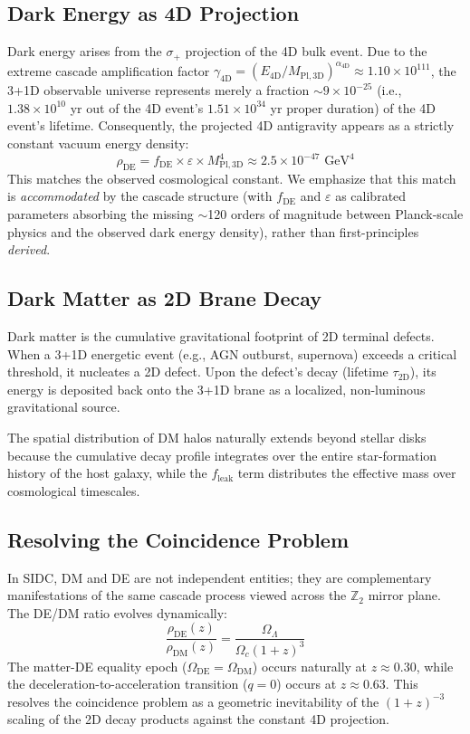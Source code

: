 \documentclass[12pt, a4paper]{article}
\newcommand{\mpld}[1]{M_{\text{Pl},#1\text{D}}}
\begin{document}
\subsection{Dark Energy as 4D Projection}
Dark energy arises from the $\sigma_+$ projection of the 4D bulk event. Due to the extreme cascade amplification factor $\gamma_{4\text{D}} = (E_{4\text{D}}/\mpld{3})^{\alpha_{4\text{D}}} \approx 1.10 \times 10^{111}$, the 3+1D observable universe represents merely a fraction $\sim 9 \times 10^{-25}$ (i.e., $1.38 \times 10^{10}$ yr out of the 4D event's $1.51 \times 10^{34}$ yr proper duration) of the 4D event's lifetime. Consequently, the projected 4D antigravity appears as a strictly constant vacuum energy density:
\begin{equation}
    \rho_{\text{DE}} = f_{\text{DE}} \times \varepsilon \times \mpld{3}^4 \approx 2.5 \times 10^{-47} \text{ GeV}^4
\end{equation}
This matches the observed cosmological constant. We emphasize that this match is \textit{accommodated} by the cascade structure (with $f_{\text{DE}}$ and $\varepsilon$ as calibrated parameters absorbing the missing $\sim$120 orders of magnitude between Planck-scale physics and the observed dark energy density), rather than first-principles \textit{derived}.

\subsection{Dark Matter as 2D Brane Decay}
Dark matter is the cumulative gravitational footprint of 2D terminal defects. When a 3+1D energetic event (e.g., AGN outburst, supernova) exceeds a critical threshold, it nucleates a 2D defect. Upon the defect's decay (lifetime $\tau_{2\text{D}}$), its energy is deposited back onto the 3+1D brane as a localized, non-luminous gravitational source. 

The spatial distribution of DM halos naturally extends beyond stellar disks because the cumulative decay profile integrates over the entire star-formation history of the host galaxy, while the $f_{\text{leak}}$ term distributes the effective mass over cosmological timescales.

\subsection{Resolving the Coincidence Problem}
In SIDC, DM and DE are not independent entities; they are complementary manifestations of the same cascade process viewed across the $\mathbb{Z}_{2}$ mirror plane. The DE/DM ratio evolves dynamically:
\begin{equation}
    \frac{\rho_{\text{DE}}(z)}{\rho_{\text{DM}}(z)} = \frac{\Omega_\Lambda}{\Omega_c (1+z)^3}
\end{equation}
The matter-DE equality epoch ($\Omega_{\text{DE}} = \Omega_{\text{DM}}$) occurs naturally at $z \approx 0.30$, while the deceleration-to-acceleration transition ($q=0$) occurs at $z \approx 0.63$. This resolves the coincidence problem as a geometric inevitability of the $(1+z)^{-3}$ scaling of the 2D decay products against the constant 4D projection.
\end{document}
